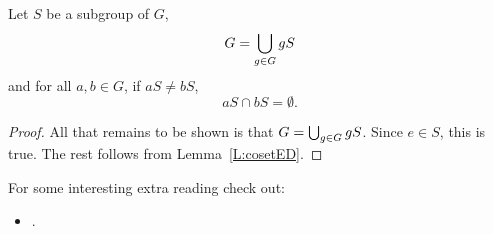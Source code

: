 \documentclass{ximera}
\begin{document}
\begin{theorem}\label{T:CPG}
  Let $S$ be a subgroup of $G$, 
  \[
  G = \bigcup_{g\in G} gS
  \]
  and for all $a,b\in G$, if $aS \ne bS$,
  \[
  aS\cap bS = \emptyset.
  \]
  \begin{proof}
    All that remains to be shown is that $G = \bigcup_{g\in G}
    gS$. Since $e\in S$, this is true. The rest follows from
    Lemma~\ref{L:cosetED}.
  \end{proof}
\end{theorem}













For some interesting extra reading check out:
\begin{itemize}
\item {}.
\end{itemize}
\end{document}
